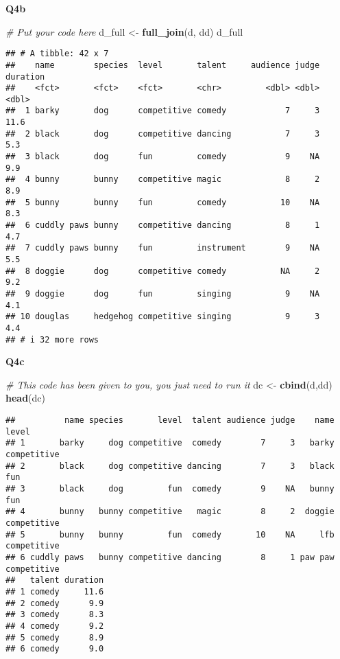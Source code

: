 \documentclass[
]{article}
\newenvironment{Shaded}{\begin{snugshade}}{\end{snugshade}}
\newcommand{\CommentTok}[1]{\textcolor[rgb]{0.56,0.35,0.01}{\textit{#1}}}
\newcommand{\FunctionTok}[1]{\textcolor[rgb]{0.13,0.29,0.53}{\textbf{#1}}}
\newcommand{\NormalTok}[1]{#1}
\newcommand{\OtherTok}[1]{\textcolor[rgb]{0.56,0.35,0.01}{#1}}
\begin{document}
\textbf{Q4b}

\begin{Shaded}
\begin{Highlighting}[]
\CommentTok{\# Put your code here}
\NormalTok{d\_full }\OtherTok{\textless{}{-}} \FunctionTok{full\_join}\NormalTok{(d, dd)}
\NormalTok{d\_full}
\end{Highlighting}
\end{Shaded}

\begin{verbatim}
## # A tibble: 42 x 7
##    name        species  level       talent     audience judge duration
##    <fct>       <fct>    <fct>       <chr>         <dbl> <dbl>    <dbl>
##  1 barky       dog      competitive comedy            7     3     11.6
##  2 black       dog      competitive dancing           7     3      5.3
##  3 black       dog      fun         comedy            9    NA      9.9
##  4 bunny       bunny    competitive magic             8     2      8.9
##  5 bunny       bunny    fun         comedy           10    NA      8.3
##  6 cuddly paws bunny    competitive dancing           8     1      4.7
##  7 cuddly paws bunny    fun         instrument        9    NA      5.5
##  8 doggie      dog      competitive comedy           NA     2      9.2
##  9 doggie      dog      fun         singing           9    NA      4.1
## 10 douglas     hedgehog competitive singing           9     3      4.4
## # i 32 more rows
\end{verbatim}

\textbf{Q4c}

\begin{Shaded}
\begin{Highlighting}[]
\CommentTok{\# This code has been given to you, you just need to run it}
\NormalTok{dc }\OtherTok{\textless{}{-}} \FunctionTok{cbind}\NormalTok{(d,dd)}
\FunctionTok{head}\NormalTok{(dc)}
\end{Highlighting}
\end{Shaded}

\begin{verbatim}
##          name species       level  talent audience judge    name       level
## 1       barky     dog competitive  comedy        7     3   barky competitive
## 2       black     dog competitive dancing        7     3   black         fun
## 3       black     dog         fun  comedy        9    NA   bunny         fun
## 4       bunny   bunny competitive   magic        8     2  doggie competitive
## 5       bunny   bunny         fun  comedy       10    NA     lfb competitive
## 6 cuddly paws   bunny competitive dancing        8     1 paw paw competitive
##   talent duration
## 1 comedy     11.6
## 2 comedy      9.9
## 3 comedy      8.3
## 4 comedy      9.2
## 5 comedy      8.9
## 6 comedy      9.0
\end{verbatim}
\end{document}
